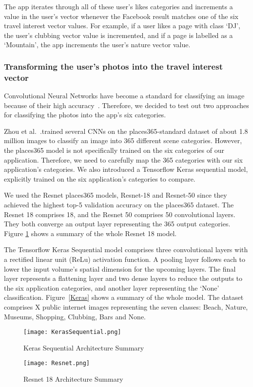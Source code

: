 The app iterates through
all of these user's likes categories and increments a value in the user's
vector whenever the Facebook result matches one of the six travel interest
vector values. For example, if a user likes a page with class `DJ', the user's
clubbing vector value is incremented, and if a page is labelled as a
`Mountain', the app increments the user's nature vector value.

\subsubsection{Transforming the user's photos into the travel interest vector}


Convolutional Neural Networks have become a standard
for classifying an image because of their high
accuracy~\cite{Zhou2018}. Therefore, we decided to test
out two approaches for classifying the photos into the
app's six categories. 

Zhou et al.~\cite{Zhou2018}.trained several CNNs on the
places365-standard  dataset of about 1.8 million
images to classify an image into 365 different scene
categories. However, the places365 model is not
specifically trained on the six categories of our
application. Therefore, we need to carefully map the
365 categories with our six application's categories.
We also introduced a Tensorflow Keras
sequential model, explicitly trained on the six
application's categories to compare.

We used the Resnet places365 models, Resnet-18 and
Resnet-50 since they achieved the highest top-5
validation accuracy on the places365 dataset. The
Resnet 18 comprises 18, and the Resnet 50 comprises 50
convolutional layers. They both converge an output
layer representing the 365 output categories.  Figure
\ref{Resnet} shows a summary of the whole Resnet 18 model. 


The Tensorflow Keras Sequential model comprises three
convolutional layers with a rectified linear unit
(ReLu) activation function. A pooling layer follows
each to lower the input volume's spatial dimension for
the upcoming layers. The final layer represents a
flattening layer and two dense layers to reduce the
outputs to the six application categories, and another
layer representing the `None' classification. Figure~\ref{Keras}
shows a summary of the whole model. The dataset
comprises X public internet images representing the
seven classes: Beach, Nature, Museums, Shopping,
Clubbing, Bars and None.

\begin{figure}[!tbp]
  \centering
  \begin{minipage}[b]{0.4\textwidth}
    \texttt{[image: KerasSequential.png]}
    \caption{Keras Sequential Architecture Summary}
    \label{Keras}
  \end{minipage}
  \hfill
  \begin{minipage}[b]{0.4\textwidth}
\texttt{[image: Resnet.png]}
\caption{Resnet 18 Architecture Summary}
\label{Resnet}
  \end{minipage}
\end{figure}

